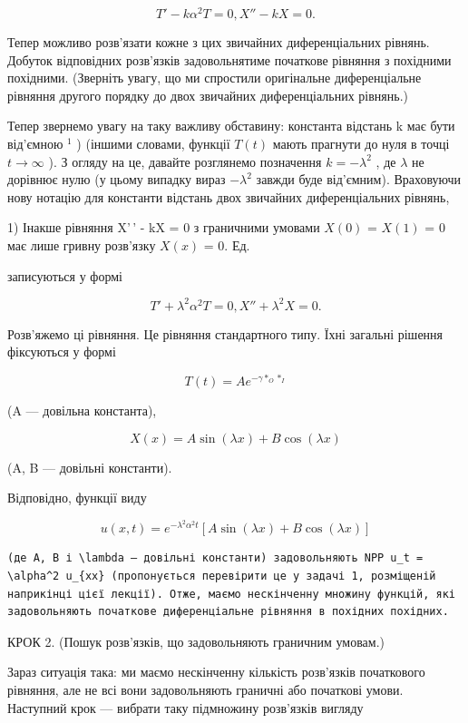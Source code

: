 \documentclass[
  ukrainian,
]{article}
\begin{document}
\[
T'-k\alpha^2T=0,
X''-kX=0.
\]

Тепер можливо розв'язати кожне з цих звичайних диференціальних рівнянь.
Добуток відповідних розв'язків задовольнятиме початкове рівняння з
похідними похідними. (Зверніть увагу, що ми спростили оригінальне
диференціальне рівняння другого порядку до двох звичайних
диференціальних рівнянь.)

Тепер звернемо увагу на таку важливу обставину: константа відстань k має
бути від'ємною \(^1\) ) (іншими словами, функції \(T(t)\) мають прагнути
до нуля в точці \(t \to \infty\) ). З огляду на це, давайте розглянемо
позначення \(k = -\lambda^2\) , де \(\lambda\) не дорівнює нулю (у цьому
випадку вираз \(-\lambda^2\) завжди буде від'ємним). Враховуючи нову
нотацію для константи відстань двох звичайних диференціальних рівнянь,

1) Інакше рівняння X'\,' - kX = 0 з граничними умовами \(X(0)\) =
\(X(1)\) = 0 має лише гривну розв'язку \(X(x)\) = 0. Ед.

записуються у формі

\[
T' + \lambda^2 \alpha^2 T = 0,
X'' + \lambda^2 X = 0.
\]

Розв'яжемо ці рівняння. Це рівняння стандартного типу. Їхні загальні
рішення фіксуються у формі

\[
T(t) = Ae^{-\gamma *_{O} *_{I}}
\]

(A --- довільна константа),

\[
X(x) = A \sin(\lambda x) + B \cos(\lambda x)
\]

(A, B --- довільні константи).

Відповідно, функції виду

\[
u(x, t) = e^{-\lambda^2 \alpha^2 t} [A \sin(\lambda x) + B \cos(\lambda x)]
\]

\begin{verbatim}
(де A, B і \lambda — довільні константи) задовольняють NPP u_t = \alpha^2 u_{xx} (пропонується перевірити це у задачі 1, розміщеній наприкінці цієї лекції). Отже, маємо нескінченну множину функцій, які задовольняють початкове диференціальне рівняння в похідних похідних.
\end{verbatim}

КРОК 2. (Пошук розв'язків, що задовольняють граничним умовам.)

Зараз ситуація така: ми маємо нескінченну кількість розв'язків
початкового рівняння, але не всі вони задовольняють граничні або
початкові умови. Наступний крок --- вибрати таку підмножину розв'язків
вигляду
\end{document}
